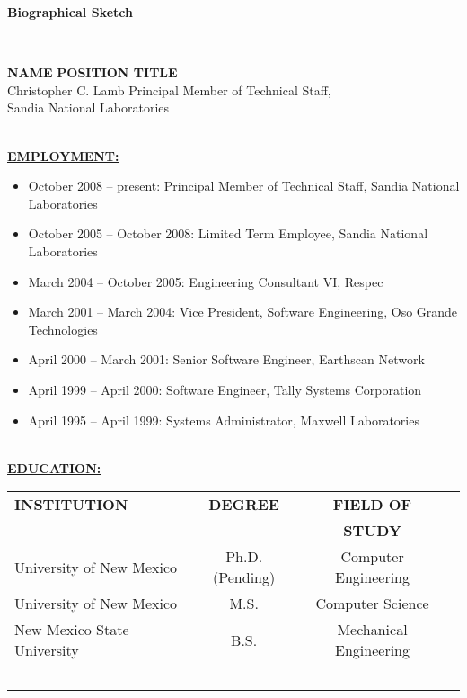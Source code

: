 \documentclass [11pt]{article}
\begin{document}
\setlength{\baselineskip}{12pt}
\newpage
\setcounter{page}{1}
\parindent 0in
\begin{center}
{\Large\bf{\sc Biographical Sketch}}
\end{center}
\vspace*{-0.1in}
{\textcolor{black}{\makebox[6.5in]{\hrulefill}} ~\\
\vspace*{-0.35in}
\begin{tabbing}
   {\bf NAME} \hspace*{2.5in} \= {\bf POSITION TITLE} \\
   Christopher C. Lamb	      \>  Principal Member of Technical Staff, \\
                                                     \> Sandia National Laboratories
\end{tabbing}
\vspace*{-0.1in}
{\textcolor{black}{\makebox[6.5in]{\hrulefill}} ~\\
\vspace*{-0.2in}
\underline{\bf EMPLOYMENT:} ~\\
\begin{itemize}
\item October 2008 -- present: Principal Member of Technical Staff, Sandia National Laboratories
\item October 2005 -- October 2008: Limited Term Employee, Sandia National Laboratories
\item March 2004 -- October 2005: Engineering Consultant VI, Respec
\item March 2001 -- March 2004: Vice President, Software Engineering, Oso Grande Technologies
\item April 2000 -- March 2001: Senior Software Engineer, Earthscan Network
\item April 1999 -- April 2000: Software Engineer, Tally Systems Corporation
\item April 1995 -- April 1999: Systems Administrator, Maxwell Laboratories
\end{itemize}
\vspace*{-0.1in}
{\textcolor{black}{\makebox[6.5in]{\hrulefill}} ~\\

\vspace*{-0.2in}
\underline{\bf EDUCATION:} ~\\
\begin{tabular}{lccc}
{\bf INSTITUTION}  & {\bf DEGREE} & {\bf  FIELD OF} \\ 
                                                     && {\bf STUDY} \\
University of New Mexico & Ph.D. (Pending) & Computer Engineering \\
University of New Mexico & M.S. & Computer Science \\
New Mexico State University & B.S. & Mechanical Engineering \\~\\
\end{tabular}

}}}
\end{document}
